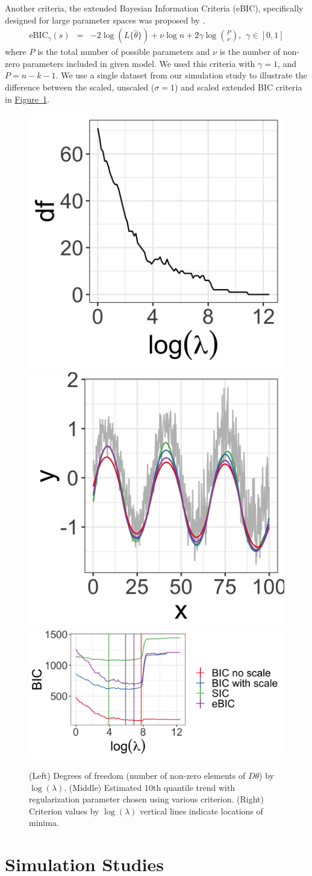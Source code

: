 \documentclass[12pt]{article}
\newcommand{\Fig}[1]{\hyperref[fig:#1]{Figure~\ref*{fig:#1}}} %
\newcommand{\Fig}[1]{{Figure~\ref{fig:#1}}} %
\begin{document}
	Another criteria, the extended Bayesian Information Criteria (eBIC), specifically designed for large parameter spaces was proposed by \cite{chen2008}. 
	\begin{eqnarray*}
	\label{eq:eBIC}
	\mbox{eBIC}_{\gamma}(s) & = & -2\log(L\{\hat{\theta}\}) + \nu\log n  + 2\gamma\log{P \choose \nu},~~\gamma \in [0,1]
	\end{eqnarray*}
	where $P$ is the total number of possible parameters and $\nu$ is the number of non-zero parameters included in given model. We used this criteria with $\gamma = 1$, and $P=n-k-1$. We use a single dataset from our simulation study to illustrate the difference between the scaled, unscaled ($\sigma = 1$) and scaled extended BIC criteria in \Fig{BIC}. 
	
	\begin{figure}[h!]
		\includegraphics[width = 0.25\linewidth]{Figures/df_by_lambda.png}
		\includegraphics[width = 0.25\linewidth]{Figures/BIC_data.png}
		\includegraphics[width = 0.5\linewidth]{Figures/BIC_by_lambda.png} 
		\caption{(Left) Degrees of freedom (number of non-zero elements of $D\theta$) by $\log(\lambda)$. (Middle) Estimated 10th quantile trend with regularization parameter chosen using various criterion. (Right) Criterion values by $\log(\lambda)$ vertical lines indicate locations of minima.} 		
		\label{fig:BIC}		
	\end{figure}

	\section{Simulation Studies}
	
\end{document}
